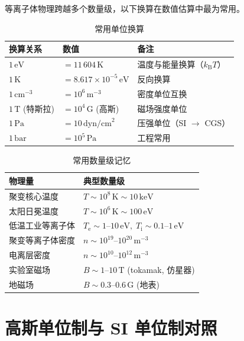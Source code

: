 \documentclass[12pt,a4paper,openany,oneside]{book}
\newcommand{\ii}{\mathrm{i}}
\newcommand{\ee}{\mathrm{e}}
\begin{document}
等离子体物理跨越多个数量级，以下换算在数值估算中最为常用。

\begin{table}[htbp]
\centering
\caption{常用单位换算}
\begin{tabular}{@{}lll@{}}
\toprule
\textbf{换算关系} & \textbf{数值} & \textbf{备注} \\
\midrule
$1\,\mathrm{eV}$ & $= 11\,604\,\mathrm{K}$ & 温度与能量换算（$k_\mathrm{B} T$） \\
$1\,\mathrm{K}$ & $= 8.617\times 10^{-5}\,\mathrm{eV}$ & 反向换算 \\
\midrule
$1\,\mathrm{cm}^{-3}$ & $= 10^{6}\,\mathrm{m}^{-3}$ & 密度单位互换 \\
$1\,\mathrm{T}$ (特斯拉) & $= 10^{4}\,\mathrm{G}$ (高斯) & 磁场强度单位 \\
\midrule
$1\,\mathrm{Pa}$ & $= 10\,\mathrm{dyn/cm}^2$ & 压强单位（SI $\to$ CGS） \\
$1\,\mathrm{bar}$ & $= 10^{5}\,\mathrm{Pa}$ & 工程常用 \\
\bottomrule
\end{tabular}
\end{table}

\begin{table}[htbp]
\centering
\caption{常用数量级记忆}
\begin{tabular}{@{}ll@{}}
\toprule
\textbf{物理量} & \textbf{典型数量级} \\
\midrule
聚变核心温度 & $T\sim 10^8\,\mathrm{K}\sim 10\,\mathrm{keV}$ \\
太阳日冕温度 & $T\sim 10^6\,\mathrm{K}\sim 100\,\mathrm{eV}$ \\
低温工业等离子体 & $T_\ee\sim 1\text{--}10\,\mathrm{eV},\; T_\ii\sim 0.1\text{--}1\,\mathrm{eV}$ \\
聚变等离子体密度 & $n\sim 10^{19}\text{--}10^{20}\,\mathrm{m}^{-3}$ \\
电离层密度 & $n\sim 10^{10}\text{--}10^{12}\,\mathrm{m}^{-3}$ \\
实验室磁场 & $B\sim 1\text{--}10\,\mathrm{T}$ (tokamak, 仿星器) \\
地磁场 & $B\sim 0.3\text{--}0.6\,\mathrm{G}$ (地表) \\
\bottomrule
\end{tabular}
\end{table}


\section*{高斯单位制与 SI 单位制对照}
{}
\end{document}
